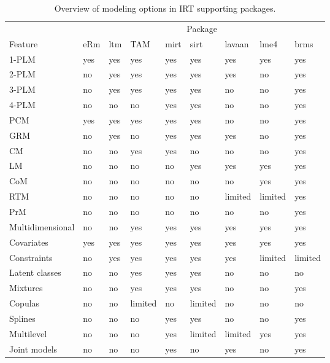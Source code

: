 \documentclass[jss]{jss}
\begin{document}
\begin{CodeChunk}
\begin{table}[t]

\caption{\label{tab:pkg-compare}Overview of modeling options in IRT supporting packages.}
\centering
\begin{threeparttable}
\begin{tabular}{lllllllll}
\toprule
\multicolumn{1}{c}{ } & \multicolumn{8}{c}{Package} \\
\cmidrule(l{3pt}r{3pt}){2-9}
Feature & eRm & ltm & TAM & mirt & sirt & lavaan & lme4 & brms\\
\hline
1-PLM & yes & yes & yes & yes & yes & yes & yes & yes\\
2-PLM & no & yes & yes & yes & yes & yes & no & yes\\
3-PLM & no & yes & yes & yes & yes & no & no & yes\\
4-PLM & no & no & no & yes & yes & no & no & yes\\
\addlinespace
PCM & yes & yes & yes & yes & yes & no & no & yes\\
GRM & no & yes & no & yes & yes & yes & no & yes\\
CM & no & no & yes & yes & no & no & no & yes\\
LM & no & no & no & no & yes & yes & yes & yes\\
CoM & no & no & no & no & no & no & yes & yes\\
\addlinespace
RTM & no & no & no & no & no & limited & limited & yes\\
PrM & no & no & no & no & no & no & no & yes\\
\hline
Multidimensional & no & no & yes & yes & yes & yes & yes & yes\\
Covariates & yes & yes & yes & yes & yes & yes & yes & yes\\
Constraints & no & yes & yes & yes & yes & yes & limited & limited\\
\addlinespace
Latent classes & no & no & yes & yes & yes & no & no & no\\
Mixtures & no & no & yes & yes & yes & no & no & yes\\
Copulas & no & no & limited & no & limited & no & no & no\\
Splines & no & no & no & yes & yes & no & no & yes\\
Multilevel & no & no & no & yes & limited & limited & yes & yes\\
\addlinespace
Joint models & no & no & no & yes & no & yes & no & yes\\

\end{tabular}
\end{threeparttable}
\end{table}
\end{CodeChunk}
\end{document}

